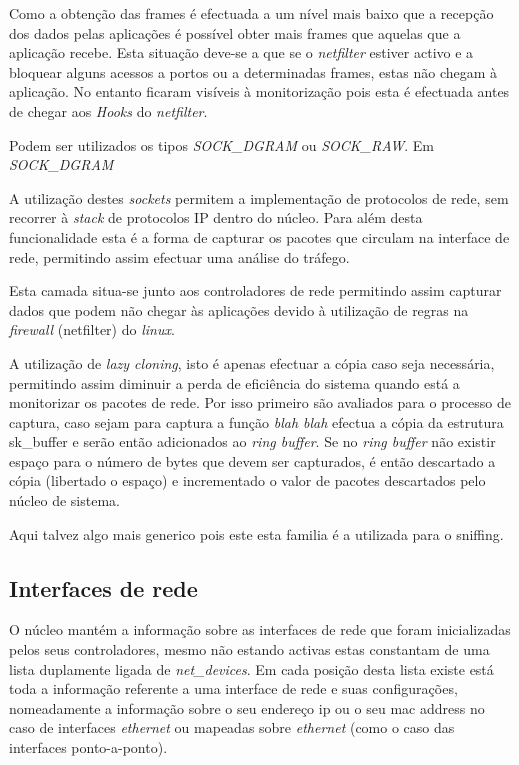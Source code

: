  Como a obtenção das frames é efectuada a um nível mais baixo que a recepção dos dados pelas aplicações é possível obter mais frames que aquelas que a aplicação recebe. 
 Esta situação deve-se a que se o \textit{netfilter} estiver activo e a bloquear alguns acessos a portos ou a determinadas frames, estas não chegam à aplicação.
 No entanto ficaram visíveis à monitorização pois esta é efectuada antes de chegar aos \textit{Hooks} do \textit{netfilter}.
 

 Podem ser utilizados os tipos \textit{SOCK\_DGRAM} ou \textit{SOCK\_RAW}. Em \textit{SOCK\_DGRAM}
 

 A utilização destes \textit{sockets} permitem a implementação de protocolos de rede, sem recorrer à \textit{stack} de protocolos IP dentro do núcleo.
 Para além desta funcionalidade esta é a forma de capturar os pacotes que circulam na interface de rede, permitindo assim efectuar uma análise do tráfego.

 Esta camada situa-se junto aos controladores de rede permitindo assim capturar dados que podem não chegar às aplicações devido à utilização de regras na \textit{firewall} (netfilter) do \textit{linux}.

 A utilização de \textit{lazy cloning}, isto é apenas efectuar a cópia caso seja necessária, permitindo assim diminuir a perda de eficiência do sistema quando está a monitorizar os pacotes de rede.
 Por isso primeiro são avaliados para o processo de captura, caso sejam para captura a função \textit{blah blah} efectua a cópia da estrutura sk\_buffer e serão então adicionados ao \textit{ring buffer}.
 Se no \textit{ring buffer} não existir espaço para o número de bytes que devem ser capturados, é então descartado a cópia (libertado o espaço) e incrementado o valor de pacotes descartados pelo núcleo de sistema.


Aqui talvez algo mais generico pois este esta familia é a utilizada para o sniffing.


\subsection{Interfaces de rede}

O núcleo mantém a informação sobre as interfaces de rede que foram inicializadas pelos seus controladores, mesmo não estando activas estas constantam de uma lista duplamente ligada de \textit{net\_devices}. 
 Em cada posição desta lista existe está toda a informação referente a uma interface de rede e suas configurações, nomeadamente a informação sobre o seu endereço ip ou o seu mac address no caso de interfaces \textit{ethernet} ou mapeadas sobre \textit{ethernet} (como o caso das interfaces ponto-a-ponto).

